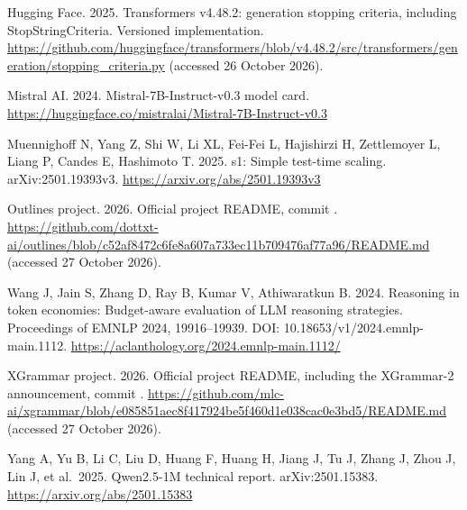 \documentclass[
  12pt,
  a4paper,
]{article}
\begin{document}
Hugging Face. 2025. Transformers v4.48.2: generation stopping criteria,
including StopStringCriteria. Versioned implementation.
\url{https://github.com/huggingface/transformers/blob/v4.48.2/src/transformers/generation/stopping_criteria.py}
(accessed 26 October 2026).

Mistral AI. 2024. Mistral-7B-Instruct-v0.3 model card.
\url{https://huggingface.co/mistralai/Mistral-7B-Instruct-v0.3}

Muennighoff N, Yang Z, Shi W, Li XL, Fei-Fei L, Hajishirzi H,
Zettlemoyer L, Liang P, Candes E, Hashimoto T. 2025. s1: Simple
test-time scaling. arXiv:2501.19393v3.
\url{https://arxiv.org/abs/2501.19393v3}

Outlines project. 2026. Official project README, commit
\texttt{}.
\url{https://github.com/dottxt-ai/outlines/blob/c52af8472c6fe8a607a733ec11b709476af77a96/README.md}
(accessed 27 October 2026).

Wang J, Jain S, Zhang D, Ray B, Kumar V, Athiwaratkun B. 2024. Reasoning
in token economies: Budget-aware evaluation of LLM reasoning strategies.
Proceedings of EMNLP 2024, 19916--19939. DOI:
10.18653/v1/2024.emnlp-main.1112.
\url{https://aclanthology.org/2024.emnlp-main.1112/}

XGrammar project. 2026. Official project README, including the
XGrammar-2 announcement, commit
\texttt{}.
\url{https://github.com/mlc-ai/xgrammar/blob/e085851aec8f417924be5f460d1e038cac0e3bd5/README.md}
(accessed 27 October 2026).

Yang A, Yu B, Li C, Liu D, Huang F, Huang H, Jiang J, Tu J, Zhang J,
Zhou J, Lin J, et al.~2025. Qwen2.5-1M technical report.
arXiv:2501.15383. \url{https://arxiv.org/abs/2501.15383}
\end{document}
